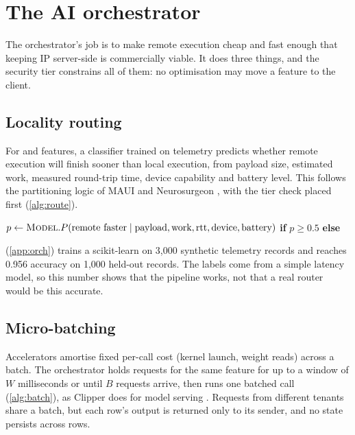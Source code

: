 \section{The AI orchestrator}\label{sec:orch}

The orchestrator's job is to make remote execution cheap and fast enough that keeping IP
server-side is commercially viable. It does three things, and the security tier constrains
all of them: no optimisation may move a  feature to the client.

\subsection{Locality routing}
For  and  features, a classifier trained on telemetry predicts
whether remote execution will finish sooner than local execution, from payload size,
estimated work, measured round-trip time, device capability and battery level. This follows
the partitioning logic of MAUI and Neurosurgeon \cite{cuervo2010maui,kang2017neurosurgeon},
with the tier check placed first (\cref{alg:route}).

\begin{algorithm}[htbp]
\caption{\((r)\)}\label{alg:route}
\small
\begin{algorithmic}[1]
 \Return {}  \EndIf
{} \Return {} \EndIf
\State \(p \gets \textsc{Model}.P(\text{remote faster} \mid \text{payload}, \text{work}, \text{rtt}, \text{device}, \text{battery})\)
\State \Return {} \textbf{if} \(p \ge 0.5\) \textbf{else} 
\end{algorithmic}
\end{algorithm}

 (\cref{app:orch}) trains a scikit-learn
 \cite{pedregosa2011sklearn} on 3,000 synthetic telemetry
records and reaches 0.956 accuracy on 1,000 held-out records. The labels come from a simple
latency model, so this number shows that the pipeline works, not that a real router would be
this accurate.

\subsection{Micro-batching}
Accelerators amortise fixed per-call cost (kernel launch, weight reads) across a batch. The
orchestrator holds requests for the same feature for up to a window of \(W\) milliseconds
or until \(B\) requests arrive, then runs one batched call (\cref{alg:batch}), as Clipper
does for model serving \cite{crankshaw2017clipper}. Requests from different tenants share a
batch, but each row's output is returned only to its sender, and no state persists across
rows.

